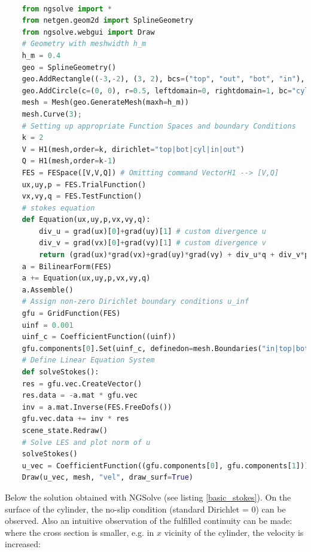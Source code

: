 \pagebreak

\null
\vfill

\begin{lstlisting}[language=Python, title=Basic Stokes PDE's with Python3 and NGSolve, label=basic_stokes]
    
    from ngsolve import *
    from netgen.geom2d import SplineGeometry
    from ngsolve.webgui import Draw
    # Geometry with meshwidth h_m
    h_m = 0.4
    geo = SplineGeometry()
    geo.AddRectangle((-3,-2), (3, 2), bcs=("top", "out", "bot", "in"), leftdomain=1, rightdomain=0)
    geo.AddCircle(c=(0, 0), r=0.5, leftdomain=0, rightdomain=1, bc="cyl", maxh=h_m) 
    mesh = Mesh(geo.GenerateMesh(maxh=h_m))
    mesh.Curve(3);
    # Setting up appropriate Function Spaces and boundary Conditions
    k = 2
    V = H1(mesh,order=k, dirichlet="top|bot|cyl|in|out")
    Q = H1(mesh,order=k-1)
    FES = FESpace([V,V,Q]) # Omitting command VectorH1 --> [V,Q] 
    ux,uy,p = FES.TrialFunction()
    vx,vy,q = FES.TestFunction()
    # stokes equation
    def Equation(ux,uy,p,vx,vy,q):
        div_u = grad(ux)[0]+grad(uy)[1] # custom divergence u
        div_v = grad(vx)[0]+grad(vy)[1] # custom divergence v
        return (grad(ux)*grad(vx)+grad(uy)*grad(vy) + div_u*q + div_v*p)* dx
    a = BilinearForm(FES)
    a += Equation(ux,uy,p,vx,vy,q)
    a.Assemble()
    # Assign non-zero Dirichlet boundary conditions u_inf
    gfu = GridFunction(FES)
    uinf = 0.001
    uinf_c = CoefficientFunction((uinf))
    gfu.components[0].Set(uinf_c, definedon=mesh.Boundaries("in|top|bot|out"))
    # Define Linear Equation System
    def solveStokes():
    res = gfu.vec.CreateVector()
    res.data = -a.mat * gfu.vec
    inv = a.mat.Inverse(FES.FreeDofs())
    gfu.vec.data += inv * res
    scene_state.Redraw()
    # Solve LES and plot norm of u
    solveStokes()
    u_vec = CoefficientFunction((gfu.components[0], gfu.components[1])) 
    Draw(u_vec, mesh, "vel", draw_surf=True)

\end{lstlisting}

\vfill
\null


\pagebreak

Below the solution obtained with NGSolve (see listing \ref{basic_stokes}). On the surface of the cylinder, 
the no-slip condition (standard Dirichlet = 0) can be observed. Also an intuitive observation of the fulfilled continuity can be made:
where the cross section is smaller, e.g. in $x$ vicinity of the cylinder, the velocity is increased:

